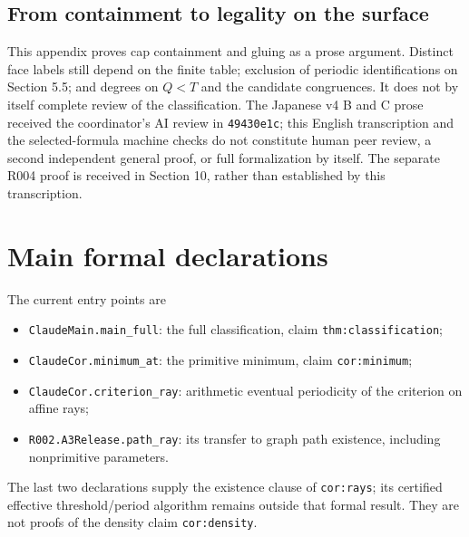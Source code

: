 \documentclass[11pt]{amsart}
\newcommand{\record}[1]{\nolinkurl{#1}}
\begin{document}
\subsection{From containment to legality on the surface}
This appendix proves cap containment and gluing as a prose argument.
Distinct face labels still depend on the finite table; exclusion of
periodic identifications on Section 5.5; and degrees on $Q<T$ and the
candidate congruences. It does not by itself complete review of the
classification. The Japanese v4 B and C prose received the coordinator's
AI review in \record{49430e1c}; this English transcription and the
selected-formula machine checks do not constitute human peer review,
a second independent general proof, or full formalization by itself. The separate
R004 proof is received in Section 10, rather than established by this
transcription.

\section*{Main formal declarations}
The current entry points are
\begin{itemize}
\item \record{ClaudeMain.main_full}: the full classification,
claim \record{thm:classification};
\item \record{ClaudeCor.minimum_at}: the primitive minimum,
claim \record{cor:minimum};
\item \record{ClaudeCor.criterion_ray}: arithmetic eventual periodicity
of the criterion on affine rays;
\item \record{R002.A3Release.path_ray}: its transfer to graph path
existence, including nonprimitive parameters.
\end{itemize}
The last two declarations supply the existence clause of
\record{cor:rays}; its certified effective threshold/period algorithm
remains outside that formal result. They are not proofs of the density
claim \record{cor:density}.
\end{document}
